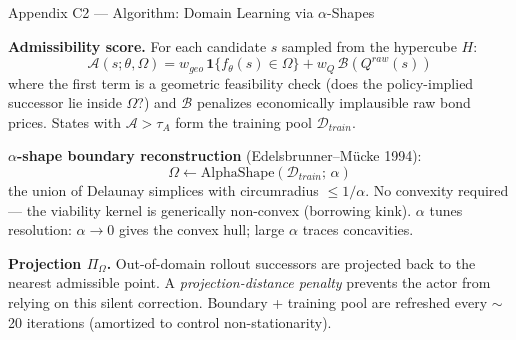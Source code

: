 \documentclass[10pt,aspectratio=169]{beamer}
\begin{document}
\begin{frame}[label=appDomain]{Appendix C2 --- Algorithm: Domain Learning via $\alpha$-Shapes}
\hfill\hyperlink{mainFinalAlgo}{}
\vspace{0.2em}

\textbf{Admissibility score.} For each candidate $s$ sampled from the hypercube $H$:
\[
\mathcal{A}(s;\theta,\Omega)=w_{geo}\,\mathbf{1}\!\big\{f_\theta(s)\in\Omega\big\}
+w_Q\,\mathcal{B}(Q^{raw}(s))
\]
where the first term is a geometric feasibility check (does the policy-implied successor lie
inside $\Omega$?) and $\mathcal{B}$ penalizes economically implausible raw bond prices.
States with $\mathcal{A}>\tau_A$ form the training pool $\mathcal{D}_{train}$.

\smallskip
\textbf{$\alpha$-shape boundary reconstruction} (Edelsbrunner--M\"ucke 1994):
\[
\Omega\leftarrow\mathrm{AlphaShape}(\mathcal{D}_{train};\,\alpha)
\]
the union of Delaunay simplices with circumradius $\le1/\alpha$.
No convexity required --- the viability kernel is generically non-convex (borrowing kink).
$\alpha$ tunes resolution: $\alpha\to0$ gives the convex hull; large $\alpha$ traces concavities.

\smallskip
\textbf{Projection $\Pi_\Omega$.} Out-of-domain rollout successors are projected back to the
nearest admissible point. A \emph{projection-distance penalty} prevents the actor from relying on
this silent correction. Boundary + training pool are refreshed every $\sim$20 iterations
(amortized to control non-stationarity).
\end{frame}
\end{document}

